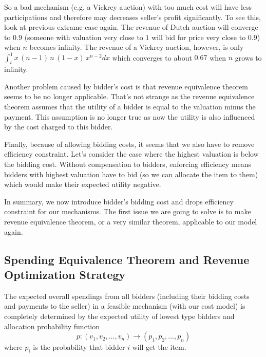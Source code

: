 So a bad mechanism (e.g. a Vickrey auction) with too much cost will have less
participations and therefore may decreases seller's profit significantly.  To see
this, look at previous extrame case again.  The revenue of Dutch auction will
converge to $0.9$ (someone with valuation very close to $1$ will bid for price
very close to $0.9$) when $n$ becomes infinity.  The revenue of a Vickrey
auction, however, is only $\int_t^1 x \, (n-1) \,n\,( 1-x) \,{x}^{n-2} dx$
which converges to about $0.67$ when $n$ grows to infinity.  

Another problem caused by bidder's cost is that revenue equivalence theorem
seems to be no longer applicable. That's not strange as the revenue equivalence
theorem assumes that the utility of a bidder is equal to the valuation minus
the payment. This assumption is no longer true as now the utility is also
influenced by the cost charged to this bidder.

Finally, because of allowing bidding costs, it seems that we also have to remove
efficiency constraint. Let's consider the case where the highest valuation is
below the bidding cost. Without compensation to bidders, enforcing efficiency means
bidders with highest valuation have to bid (so we can allocate the item to
them) which would make their expected utility negative.

In summary, we now introduce bidder's bidding cost and drops efficiency
constraint for our mechanisms. The first issue we are going to solve is to make
revenue equivalence theorem, or a very similar theorem, applicable to our model
again. 

\subsection{Spending Equivalence Theorem and Revenue Optimization Strategy}

\begin{theorem}\label{theorem:equivalence}

The expected overall spendings from all bidders (including their bidding costs
and payments to the seller) in a feasible mechanism (with our cost model) is
completely determined by the expected utility of lowest type bidders and
allocation probability function
$$p: (v_1, v_2, \ldots, v_n) \rightarrow (p_1, p_2, \ldots, p_n)$$ 
where $p_i$ is the probability that bidder $i$ will get the item.

\end{theorem}

